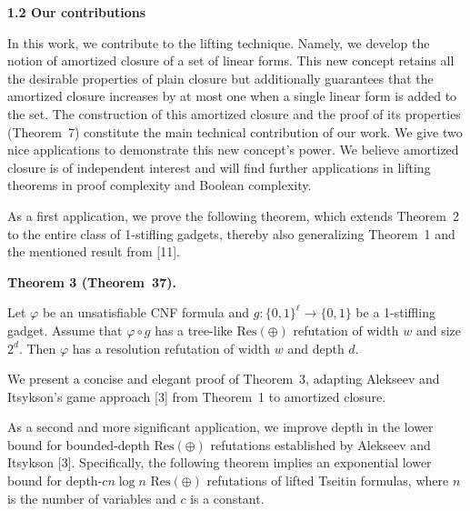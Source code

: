 \documentclass[10pt,a4paper]{article}
\begin{document}
\par\medskip\noindent\textbf{
1.2 Our contributions}\par


In this work, we contribute to the lifting technique. Namely, we develop the notion of amortized closure of a set of linear forms. This new concept retains all the desirable properties of plain closure but additionally guarantees that the amortized closure increases by at most one when a single linear form is added to the set. The construction of this amortized closure and the proof of its properties (Theorem 7) constitute the main technical contribution of our work. We give two nice applications to demonstrate this new concept’s power. We believe amortized closure is of independent interest and will find further applications in lifting theorems in proof complexity and Boolean complexity.\par



As a first application, we prove the following theorem, which extends Theorem 2 to the entire class of 1-stifling gadgets, thereby also generalizing Theorem 1 and the mentioned result from [11].\par



\par\medskip\noindent\textbf{
Theorem 3 (Theorem 37).
}\par



Let $\varphi$ be an unsatisfiable CNF formula and $g\colon\{0,1\}^{\ell}\to\{0,1\}$ be a 1-stiffling gadget.
Assume that $\varphi\circ g$ has a tree-like $\mathrm{Res}(\oplus)$ refutation of width $w$ and size $2^{d}$. Then $\varphi$ has a resolution refutation of width $w$ and depth $d$.\par




We present a concise and elegant proof of Theorem 3, adapting Alekseev and Itsykson’s game approach [3] from Theorem 1 to amortized closure.\par



As a second and more significant application, we improve depth in the lower bound for bounded-depth $\mathrm{Res}(\oplus)$ refutations established by Alekseev and Itsykson [3]. Specifically, the following theorem implies an exponential lower bound for depth-$cn\log n$ $\mathrm{Res}(\oplus)$ refutations of lifted Tseitin formulas, where $n$ is the number of variables and $c$ is a constant.\par
\end{document}
